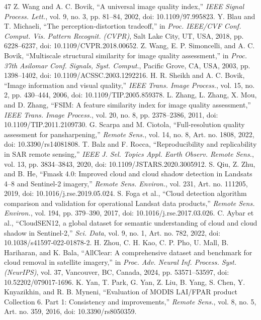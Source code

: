 \documentclass[a4paper,fleqn]{cas-dc}
\begin{document}
\begin{thebibliography}{47}
 Z. Wang and A. C. Bovik, ``A universal image quality index,'' \textit{IEEE Signal Process. Lett.}, vol. 9, no. 3, pp. 81--84, 2002, doi: 10.1109/97.995823.
 Y. Blau and T. Michaeli, ``The perception-distortion tradeoff,'' in \textit{Proc. IEEE/CVF Conf. Comput. Vis. Pattern Recognit. (CVPR)}, Salt Lake City, UT, USA, 2018, pp. 6228--6237, doi: 10.1109/CVPR.2018.00652.
 Z. Wang, E. P. Simoncelli, and A. C. Bovik, ``Multiscale structural similarity for image quality assessment,'' in \textit{Proc. 37th Asilomar Conf. Signals, Syst. Comput.}, Pacific Grove, CA, USA, 2003, pp. 1398--1402, doi: 10.1109/ACSSC.2003.1292216.
 H. R. Sheikh and A. C. Bovik, ``Image information and visual quality,'' \textit{IEEE Trans. Image Process.}, vol. 15, no. 2, pp. 430--444, 2006, doi: 10.1109/TIP.2005.859378.
 L. Zhang, L. Zhang, X. Mou, and D. Zhang, ``FSIM: A feature similarity index for image quality assessment,'' \textit{IEEE Trans. Image Process.}, vol. 20, no. 8, pp. 2378--2386, 2011, doi: 10.1109/TIP.2011.2109730.
 G. Scarpa and M. Ciotola, ``Full-resolution quality assessment for pansharpening,'' \textit{Remote Sens.}, vol. 14, no. 8, Art. no. 1808, 2022, doi: 10.3390/rs14081808.
 T. Balz and F. Rocca, ``Reproducibility and replicability in SAR remote sensing,'' \textit{IEEE J. Sel. Topics Appl. Earth Observ. Remote Sens.}, vol. 13, pp. 3834--3843, 2020, doi: 10.1109/JSTARS.2020.3005912.
 S. Qiu, Z. Zhu, and B. He, ``Fmask 4.0: Improved cloud and cloud shadow detection in Landsats 4--8 and Sentinel-2 imagery,'' \textit{Remote Sens. Environ.}, vol. 231, Art. no. 111205, 2019, doi: 10.1016/j.rse.2019.05.024.
 S. Foga et al., ``Cloud detection algorithm comparison and validation for operational Landsat data products,'' \textit{Remote Sens. Environ.}, vol. 194, pp. 379--390, 2017, doi: 10.1016/j.rse.2017.03.026.
 C. Aybar et al., ``CloudSEN12, a global dataset for semantic understanding of cloud and cloud shadow in Sentinel-2,'' \textit{Sci. Data}, vol. 9, no. 1, Art. no. 782, 2022, doi: 10.1038/s41597-022-01878-2.
 H. Zhou, C. H. Kao, C. P. Pho, U. Mall, B. Hariharan, and K. Bala, ``AllClear: A comprehensive dataset and benchmark for cloud removal in satellite imagery,'' in \textit{Proc. Adv. Neural Inf. Process. Syst. (NeurIPS)}, vol. 37, Vancouver, BC, Canada, 2024, pp. 53571--53597, doi: 10.52202/079017-1696.
 K. Yan, T. Park, G. Yan, Z. Liu, B. Yang, S. Chen, Y. Knyazikhin, and R. B. Myneni, ``Evaluation of MODIS LAI/FPAR product Collection 6. Part 1: Consistency and improvements,'' \textit{Remote Sens.}, vol. 8, no. 5, Art. no. 359, 2016, doi: 10.3390/rs8050359.

\end{thebibliography}
\end{document}
